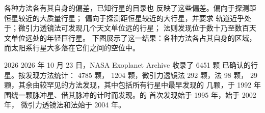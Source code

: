 各种方法各有其自身的偏差，已知行星的目录也
反映了这些偏差。偏向于探测距恒星较近的大质量行星；
偏向于探测距恒星较近的大行星，并要求
轨道近乎处于；微引力透镜法可发现几个天文单位远的行星；
法则发现位于数十乃至数百天文单位远处的年轻巨行星。
下图展示了这一结果：各种方法各占其自身的区域，
而太阳系行星大多落在它们之间的空位中。

\begin{dated}{2026}
2026 年 10 月 23 日，NASA Exoplanet Archive 收录了 6451 颗
已确认的行星。按发现方法统计： 4785 颗，
 1204 颗，微引力透镜法 292 颗，法 98 颗，
29 颗，其余由较罕见的方法发现，其中包括所有行星中最早发现的
几颗，于 1992 年围绕一颗脉冲星、借其脉冲的计时而发现。的
首次发现始于 1995 年，始于 2002 年，
微引力透镜法和法始于 2004 年。
\end{dated}

